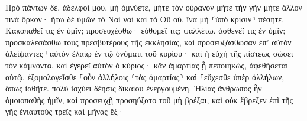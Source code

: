 \documentclass{openreader}
\begin{document}
Πρὸ πάντων δέ, ἀδελφοί μου, μὴ ὀμνύετε, μήτε τὸν οὐρανὸν μήτε τὴν γῆν μήτε ἄλλον τινὰ ὅρκον· ἤτω δὲ ὑμῶν τὸ Ναὶ ναὶ καὶ τὸ Οὒ οὔ, ἵνα μὴ ⸂ὑπὸ κρίσιν⸃ πέσητε. 
Κακοπαθεῖ τις ἐν ὑμῖν; προσευχέσθω· εὐθυμεῖ τις; ψαλλέτω. 
ἀσθενεῖ τις ἐν ὑμῖν; προσκαλεσάσθω τοὺς πρεσβυτέρους τῆς ἐκκλησίας, καὶ προσευξάσθωσαν ἐπ’ αὐτὸν ἀλείψαντες ⸀αὐτὸν ἐλαίῳ ἐν τῷ ὀνόματι τοῦ κυρίου· 
καὶ ἡ εὐχὴ τῆς πίστεως σώσει τὸν κάμνοντα, καὶ ἐγερεῖ αὐτὸν ὁ κύριος· κἂν ἁμαρτίας ᾖ πεποιηκώς, ἀφεθήσεται αὐτῷ. 
ἐξομολογεῖσθε ⸀οὖν ἀλλήλοις ⸂τὰς ἁμαρτίας⸃ καὶ ⸀εὔχεσθε ὑπὲρ ἀλλήλων, ὅπως ἰαθῆτε. πολὺ ἰσχύει δέησις δικαίου ἐνεργουμένη. 
Ἠλίας ἄνθρωπος ἦν ὁμοιοπαθὴς ἡμῖν, καὶ προσευχῇ προσηύξατο τοῦ μὴ βρέξαι, καὶ οὐκ ἔβρεξεν ἐπὶ τῆς γῆς ἐνιαυτοὺς τρεῖς καὶ μῆνας ἕξ· 
\end{document}
